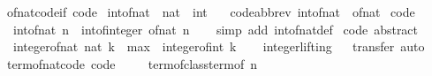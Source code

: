\begin{isabellebody}
\isanewline
%
\endisadelimproof
\isanewline
{}\isamarkupfalse%
\ of{\isacharunderscore}nat{\isacharunderscore}code{\isacharunderscore}if\ {\isacharbrackleft}code{\isacharbrackright}\isanewline
\isanewline
{}\isamarkupfalse%
\ int{\isacharunderscore}of{\isacharunderscore}nat\ {\isacharcolon}{\isacharcolon}\ {\isachardoublequoteopen}nat\ {\isasymRightarrow}\ int{\isachardoublequoteclose}\ \isanewline
\ \ {\isacharbrackleft}code{\isacharunderscore}abbrev{\isacharbrackright}{\isacharcolon}\ {\isachardoublequoteopen}int{\isacharunderscore}of{\isacharunderscore}nat\ {\isacharequal}\ of{\isacharunderscore}nat{\isachardoublequoteclose}\isanewline
\isanewline
{}\isamarkupfalse%
\ {\isacharbrackleft}code{\isacharbrackright}{\isacharcolon}\isanewline
\ \ {\isachardoublequoteopen}int{\isacharunderscore}of{\isacharunderscore}nat\ n\ {\isacharequal}\ int{\isacharunderscore}of{\isacharunderscore}integer\ {\isacharparenleft}of{\isacharunderscore}nat\ n{\isacharparenright}{\isachardoublequoteclose}\isanewline
%
\isadelimproof
\ \ %
\endisadelimproof
%
\isatagproof
{}\isamarkupfalse%
\ {\isacharparenleft}simp\ add{\isacharcolon}\ int{\isacharunderscore}of{\isacharunderscore}nat{\isacharunderscore}def{\isacharparenright}%
\endisatagproof
{\isafoldproof}%
%
\isadelimproof
\isanewline
%
\endisadelimproof
\isanewline
{}\isamarkupfalse%
\ {\isacharbrackleft}code\ abstract{\isacharbrackright}{\isacharcolon}\isanewline
\ \ {\isachardoublequoteopen}integer{\isacharunderscore}of{\isacharunderscore}nat\ {\isacharparenleft}nat\ k{\isacharparenright}\ {\isacharequal}\ max\ {}\ {\isacharparenleft}integer{\isacharunderscore}of{\isacharunderscore}int\ k{\isacharparenright}{\isachardoublequoteclose}\isanewline
\ \ \isamarkupfalse%
\ integer{\isachardot}lifting%
\isadelimproof
\ %
\endisadelimproof
%
\isatagproof
{}\isamarkupfalse%
\ transfer\ auto%
\endisatagproof
{\isafoldproof}%
%
\isadelimproof
%
\endisadelimproof
\isanewline
\isanewline
{}\isamarkupfalse%
\ term{\isacharunderscore}of{\isacharunderscore}nat{\isacharunderscore}code\ {\isacharbrackleft}code{\isacharbrackright}{\isacharcolon}\isanewline
\ \ %
\isanewline
\ \ {\isachardoublequoteopen}term{\isacharunderscore}of{\isacharunderscore}class{\isachardot}term{\isacharunderscore}of\ n\ {\isacharequal}\isanewline

\end{isabellebody}
